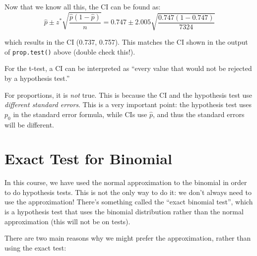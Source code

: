 \documentclass[
  letterpaper,
  DIV=11,
  numbers=noendperiod,
  oneside]{scrreprt}
\begin{document}
Now that we know all this, the CI can be found as: \[
\hat p \pm z^*\sqrt{\frac{\hat p(1-\hat p)}{n}} = 0.747 \pm 2.005\sqrt{\frac{0.747(1-0.747)}{7324}}
\]

which results in the CI (0.737, 0.757). This matches the CI shown in the
output of \texttt{prop.test()} above (double check this!).

\begin{tcolorbox}[enhanced jigsaw, toprule=.15mm, colbacktitle=quarto-callout-warning-color!10!white, title=\textcolor{quarto-callout-warning-color}{\faExclamationTriangle}\hspace{0.5em}{Non-Duality of Hypotheses and CIs}, arc=.35mm, colframe=quarto-callout-warning-color-frame, colback=white, titlerule=0mm, left=2mm, bottomtitle=1mm, bottomrule=.15mm, breakable, opacitybacktitle=0.6, leftrule=.75mm, toptitle=1mm, coltitle=black, rightrule=.15mm, opacityback=0]

For the t-test, a CI can be interpreted as ``every value that would not
be rejected by a hypothesis test.''

For proportions, it is \emph{not} true. This is because the CI and the
hypothesis test use \emph{different standard errors}. This is a very
important point: the hypothesis test uses \(p_0\) in the standard error
formula, while CIs use \(\hat p\), and thus the standard errors will be
different.

\end{tcolorbox}

\hypertarget{exact-test-for-binomial}{%
\section{Exact Test for Binomial}\label{exact-test-for-binomial}}

In this course, we have used the normal approximation to the binomial in
order to do hypothesis tests. This is not the only way to do it: we
don't always need to use the approximation! There's something called the
``exact binomial test'', which is a hypothesis test that uses the
binomial distribution rather than the normal approximation (this will
not be on tests).

There are two main reasons why we might prefer the approximation, rather
than using the exact test:
\end{document}

